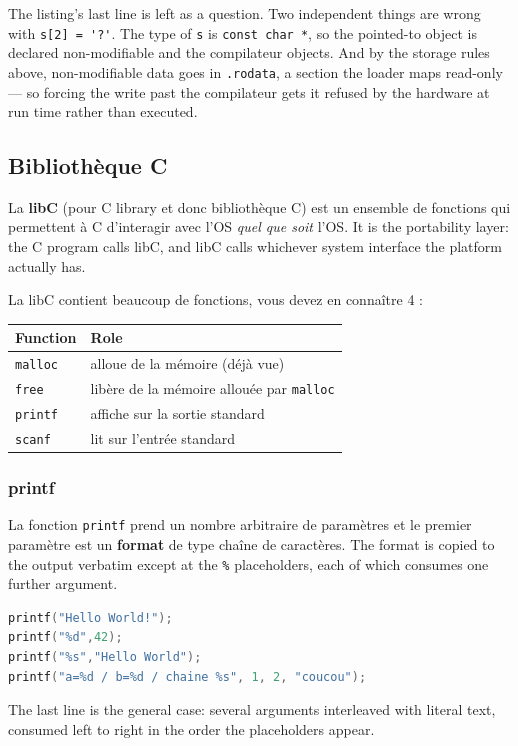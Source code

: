 \begin{remark}
  The listing's last line is left as a question. Two independent things are
  wrong with \verb|s[2] = '?'|. The type of \verb|s| is \verb|const char *|, so
  the pointed-to object is declared non-modifiable and the compilateur objects.
  And by the storage rules above, non-modifiable data goes in \verb|.rodata|, a
  section the loader maps read-only --- so forcing the write past the
  compilateur gets it refused by the hardware at run time rather than executed.
\end{remark}

\subsection{Bibliothèque C}
\begin{definition}[libC]
  La \textbf{libC} (pour C library et donc bibliothèque C) est un ensemble de
  fonctions qui permettent à C d'interagir avec l'OS \textit{quel que soit}
  l'OS. It is the portability layer: the C program calls libC, and libC calls
  whichever system interface the platform actually has.
\end{definition}

La libC contient beaucoup de fonctions, vous devez en connaître 4 :
\begin{center}
\begin{tabular}{ll}
  \toprule
  Function & Role \\
  \midrule
  \verb|malloc| & alloue de la mémoire (déjà vue) \\
  \verb|free|   & libère de la mémoire allouée par \verb|malloc| \\
  \verb|printf| & affiche sur la sortie standard \\
  \verb|scanf|  & lit sur l'entrée standard \\
  \bottomrule
\end{tabular}
\end{center}

\subsubsection{printf}
La fonction \verb|printf| prend un nombre arbitraire de paramètres et le premier
paramètre est un \textbf{format} de type chaîne de caractères. The format is
copied to the output verbatim except at the \verb|%| placeholders, each of
which consumes one further argument.

\begin{example}
  \begin{lstlisting}[language=C]
printf("Hello World!");
printf("%d",42);
printf("%s","Hello World");
printf("a=%d / b=%d / chaine %s", 1, 2, "coucou");
\end{lstlisting}
  The last line is the general case: several arguments interleaved with literal
  text, consumed left to right in the order the placeholders appear.
\end{example}


